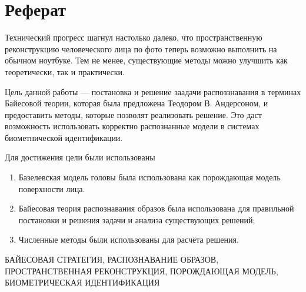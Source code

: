 \chapter*{Реферат}

Технический прогресс шагнул настолько далеко,
что пространственную реконструкцию человеческого лица по фото
теперь возможно выполнить на обычном ноутбуке.
Тем не менее,
существующие методы можно улучшить как теоретически, так и практически.

Цель данной работы --- постановка и решение заадачи распоззнавания
в терминах Байесовой теории, которая была предложена Теодором В. Андерсоном,
и предоставить методы, которые позволят реализовать решение.
Это даст возможность использовать корректно распознанные модели
в системах биометнической идентификации.

Для достижения цели были использованы
\begin{enumerate}
  \item
    Базелевская модель головы была использована
    как порождающая модель поверхности лица.
  \item
    Байесовая теория распознавания образов была использована
    для правильной постановки и решения задачи и анализа существующих решений;
  \item
    Численные методы были использованы для расчёта решения.
\end{enumerate}

\MakeUppercase{Байесовая стратегия, распознавание образов,
пространственная реконструкция, порождающая модель,
биометрическая идентификация}
